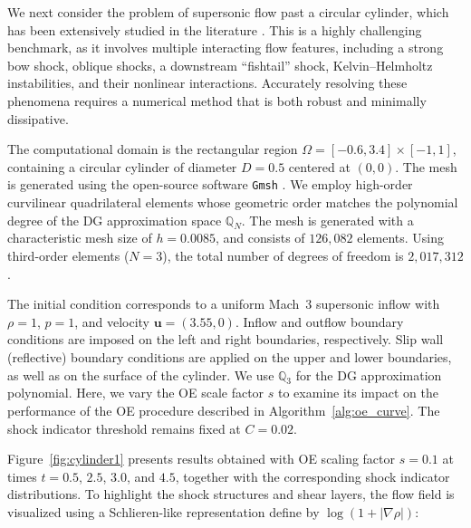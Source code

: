 \documentclass[fleqn,11pt]{amsart}
\begin{document}
{

We next consider the problem of supersonic flow past a circular
cylinder, which has been extensively studied in the literature
\cite{guermond2018second,deng2023new,nazarov2017numerical,chen2025high}.
This is a highly challenging benchmark, as it involves multiple
interacting flow features, including a strong bow shock, oblique
shocks, a downstream ``fishtail'' shock, Kelvin--Helmholtz
instabilities, and their nonlinear interactions. Accurately resolving
these phenomena requires a numerical method that is both robust and
minimally dissipative.

The computational domain is the rectangular region
$\Omega=[-0.6,3.4]\times[-1,1]$, containing a circular cylinder of
diameter $D=0.5$ centered at $(0,0)$. The mesh is generated using the
open-source software \texttt{Gmsh}
\cite{geuzaine2009gmsh,remacle2012blossom}. We employ high-order
curvilinear quadrilateral elements whose geometric order matches the
polynomial degree of the DG approximation space
$\mathbb Q_N$. The mesh is generated with a characteristic mesh size of $h=0.0085$, and consists of $126{,}082$ elements. Using
third-order elements ($N=3$), the total number of degrees of freedom is
$2{,}017{,}312$.

The initial condition corresponds to a uniform Mach~3 supersonic inflow
with $\rho=1$, $p=1$, and velocity $\bm u=(3.55,0)$. Inflow and outflow
boundary conditions are imposed on the left and right boundaries,
respectively. Slip wall (reflective) boundary conditions are applied on
the upper and lower boundaries, as well as on the surface of the
cylinder. We use $\mathbb Q_3$ for the DG approximation polynomial.
Here, we vary the OE scale factor $s$ to examine its impact on the performance of the OE procedure described in Algorithm~\ref{alg:oe_curve}. The shock indicator threshold remains fixed at $C=0.02$.

Figure~\ref{fig:cylinder1} presents results obtained with OE scaling
factor $s=0.1$ at times $t=0.5$, $2.5$, $3.0$, and $4.5$, together with
the corresponding shock indicator distributions. To highlight the shock structures and shear layers, the flow field is visualized using a Schlieren-like representation define by $\log(1+|\nabla\rho|)$:

}
\end{document}
